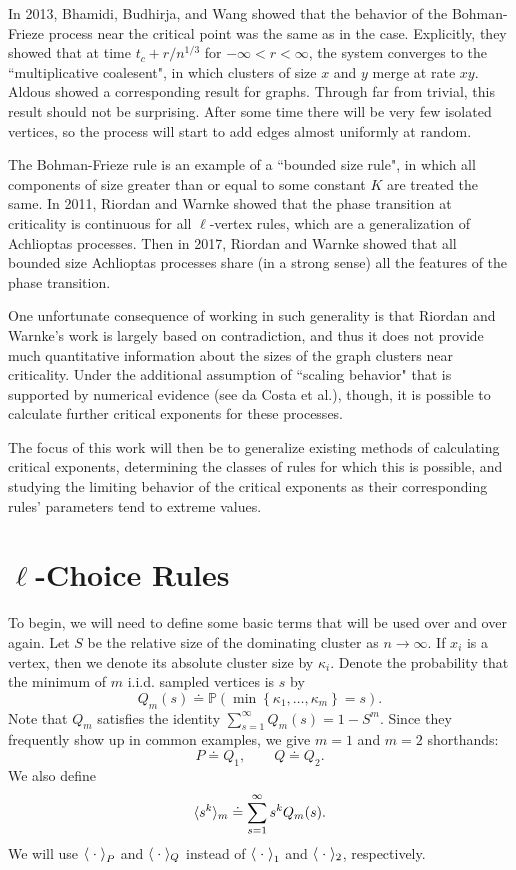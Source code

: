 \documentclass[twoside,10pt]{article}
\begin{document}
In 2013, Bhamidi, Budhirja, and Wang showed that the behavior of the Bohman-Frieze process near the critical point was the same as in the \ER case.\autocite{coal} Explicitly, they showed that at time $t_c + r/n^{1/3}$ for $-\infty<r<\infty$, the system converges to the ``multiplicative coalesent", in which clusters of size $x$ and $y$ merge at rate $xy$. Aldous showed a corresponding result for \ER graphs.\autocite{Aldous} Through far from trivial, this result should not be surprising. After some time there will be very few isolated vertices, so the process will start to add edges almost uniformly at random.

The Bohman-Frieze rule is an example of a ``bounded size rule", in which all components of size greater than or equal to some constant $K$ are treated the same. In 2011, Riordan and Warnke showed that the phase transition at criticality is continuous for all $\ell$-vertex rules,\autocite{RW-cont} which are a generalization of Achlioptas processes. Then in 2017, Riordan and Warnke showed that all bounded size Achlioptas processes share (in a strong sense) all the features of the \ER phase transition.\autocite{RW-bounded} 

One unfortunate consequence of working in such generality is that Riordan and Warnke's work is largely based on contradiction, and thus it does not provide much quantitative information about the sizes of the graph clusters near criticality. Under the additional assumption of ``scaling behavior" that is supported by numerical evidence (see da Costa et al.\autocite{daCosta}), though, it is possible to calculate further critical exponents for these processes.

The focus of this work will then be to generalize existing methods of calculating critical exponents, determining the classes of rules for which this is possible, and studying the limiting behavior of the critical exponents as their corresponding rules' parameters tend to extreme values.

\section{\texorpdfstring{$\ell$}{l}-Choice Rules}

To begin, we will need to define some basic terms that will be used over and over again. Let $S$ be the relative size of the dominating cluster as $n \to \infty$. If $x_i$ is a vertex, then we denote its absolute cluster size by $\kappa_i$. Denote the probability that the minimum of $m$ i.i.d. sampled vertices is $s$ by
\[
	Q_m(s) \doteq \mathbb{P}\left( \min\left\{ \kappa_1, \dots, \kappa_m \right\} = s \right) .
\]
Note that $Q_m$ satisfies the identity $\sum_{s=1}^{\infty} Q_m(s) = 1-S^{m}$. Since they frequently show up in common examples, we give $m=1$ and $m=2$ shorthands:
\[
	P \doteq Q_1, \quad\quad Q \doteq Q_2.
\]
We also define
\[
	\langle s^{k} \rangle_{m} \doteq \sum_{s=1}^{\infty} s^{k} Q_m(s).
\]
We will use $\left\langle \;\cdot\; \right\rangle_{P}$ and $\langle \;\cdot\; \rangle_{Q}$ instead of $\left\langle \;\cdot\; \right\rangle_{1}$ and $\langle \;\cdot\; \rangle_{2}$, respectively.
\end{document}
